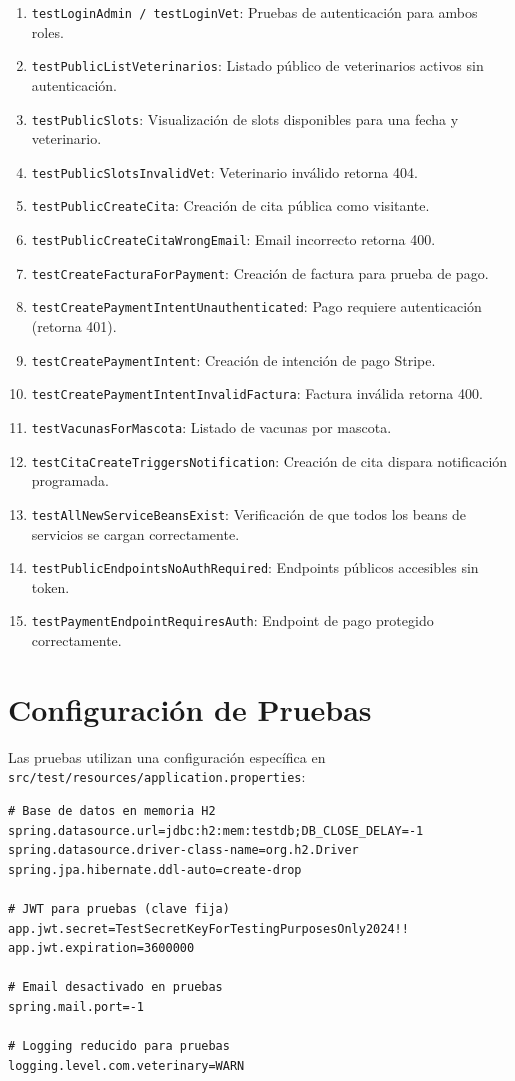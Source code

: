 \begin{enumerate}
    \item \texttt{testLoginAdmin / testLoginVet}: Pruebas de autenticaci\'on para ambos roles.
    \item \texttt{testPublicListVeterinarios}: Listado p\'ublico de veterinarios activos sin autenticaci\'on.
    \item \texttt{testPublicSlots}: Visualizaci\'on de slots disponibles para una fecha y veterinario.
    \item \texttt{testPublicSlotsInvalidVet}: Veterinario inv\'alido retorna 404.
    \item \texttt{testPublicCreateCita}: Creaci\'on de cita p\'ublica como visitante.
    \item \texttt{testPublicCreateCitaWrongEmail}: Email incorrecto retorna 400.
    \item \texttt{testCreateFacturaForPayment}: Creaci\'on de factura para prueba de pago.
    \item \texttt{testCreatePaymentIntentUnauthenticated}: Pago requiere autenticaci\'on (retorna 401).
    \item \texttt{testCreatePaymentIntent}: Creaci\'on de intenci\'on de pago Stripe.
    \item \texttt{testCreatePaymentIntentInvalidFactura}: Factura inv\'alida retorna 400.
    \item \texttt{testVacunasForMascota}: Listado de vacunas por mascota.
    \item \texttt{testCitaCreateTriggersNotification}: Creaci\'on de cita dispara notificaci\'on programada.
    \item \texttt{testAllNewServiceBeansExist}: Verificaci\'on de que todos los beans de servicios se cargan correctamente.
    \item \texttt{testPublicEndpointsNoAuthRequired}: Endpoints p\'ublicos accesibles sin token.
    \item \texttt{testPaymentEndpointRequiresAuth}: Endpoint de pago protegido correctamente.
\end{enumerate}

\section{Configuraci\'on de Pruebas}

Las pruebas utilizan una configuraci\'on espec\'ifica en \texttt{src/test/resources/application.properties}:

\begin{lstlisting}[caption=Configuraci\'on para pruebas de integraci\'on]
# Base de datos en memoria H2
spring.datasource.url=jdbc:h2:mem:testdb;DB_CLOSE_DELAY=-1
spring.datasource.driver-class-name=org.h2.Driver
spring.jpa.hibernate.ddl-auto=create-drop

# JWT para pruebas (clave fija)
app.jwt.secret=TestSecretKeyForTestingPurposesOnly2024!!
app.jwt.expiration=3600000

# Email desactivado en pruebas
spring.mail.port=-1

# Logging reducido para pruebas
logging.level.com.veterinary=WARN
\end{lstlisting}

